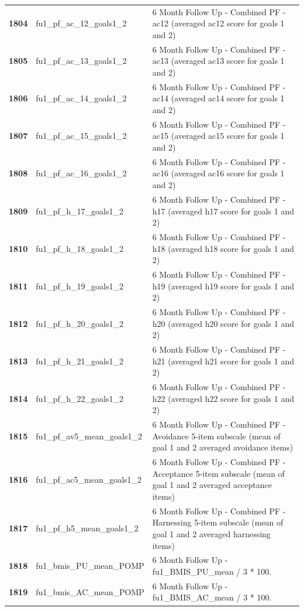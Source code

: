 \documentclass[
  letterpaper,
  DIV=11,
  numbers=noendperiod]{scrartcl}
\begin{document}
\begin{longtable}[t]{>{}cll}
\textbf{1804} & fu1\_pf\_ac\_12\_goals1\_2 & 6 Month Follow Up - Combined PF - ac12 (averaged ac12 score for goals 1 and 2)\\
\textbf{1805} & fu1\_pf\_ac\_13\_goals1\_2 & 6 Month Follow Up - Combined PF - ac13 (averaged ac13 score for goals 1 and 2)\\
\addlinespace
\textbf{1806} & fu1\_pf\_ac\_14\_goals1\_2 & 6 Month Follow Up - Combined PF - ac14 (averaged ac14 score for goals 1 and 2)\\
\textbf{1807} & fu1\_pf\_ac\_15\_goals1\_2 & 6 Month Follow Up - Combined PF - ac15 (averaged ac15 score for goals 1 and 2)\\
\textbf{1808} & fu1\_pf\_ac\_16\_goals1\_2 & 6 Month Follow Up - Combined PF - ac16 (averaged ac16 score for goals 1 and 2)\\
\textbf{1809} & fu1\_pf\_h\_17\_goals1\_2 & 6 Month Follow Up - Combined PF - h17 (averaged h17 score for goals 1 and 2)\\
\textbf{1810} & fu1\_pf\_h\_18\_goals1\_2 & 6 Month Follow Up - Combined PF - h18 (averaged h18 score for goals 1 and 2)\\
\addlinespace
\textbf{1811} & fu1\_pf\_h\_19\_goals1\_2 & 6 Month Follow Up - Combined PF - h19 (averaged h19 score for goals 1 and 2)\\
\textbf{1812} & fu1\_pf\_h\_20\_goals1\_2 & 6 Month Follow Up - Combined PF - h20 (averaged h20 score for goals 1 and 2)\\
\textbf{1813} & fu1\_pf\_h\_21\_goals1\_2 & 6 Month Follow Up - Combined PF - h21 (averaged h21 score for goals 1 and 2)\\
\textbf{1814} & fu1\_pf\_h\_22\_goals1\_2 & 6 Month Follow Up - Combined PF - h22 (averaged h22 score for goals 1 and 2)\\
\textbf{1815} & fu1\_pf\_av5\_mean\_goals1\_2 & 6 Month Follow Up - Combined PF - Avoidance 5-item subscale (mean of goal 1 and 2 averaged avoidance items)\\
\addlinespace
\textbf{1816} & fu1\_pf\_ac5\_mean\_goals1\_2 & 6 Month Follow Up - Combined PF - Acceptance 5-item subscale (mean of goal 1 and 2 averaged acceptance items)\\
\textbf{1817} & fu1\_pf\_h5\_mean\_goals1\_2 & 6 Month Follow Up - Combined PF - Harnessing 5-item subscale (mean of goal 1 and 2 averaged harnessing items)\\
\textbf{1818} & fu1\_bmis\_PU\_mean\_POMP & 6 Month Follow Up - fu1\_BMIS\_PU\_mean / 3 * 100.\\
\textbf{1819} & fu1\_bmis\_AC\_mean\_POMP & 6 Month Follow Up - fu1\_BMIS\_AC\_mean / 3 * 100.\\

\end{longtable}
\end{document}
